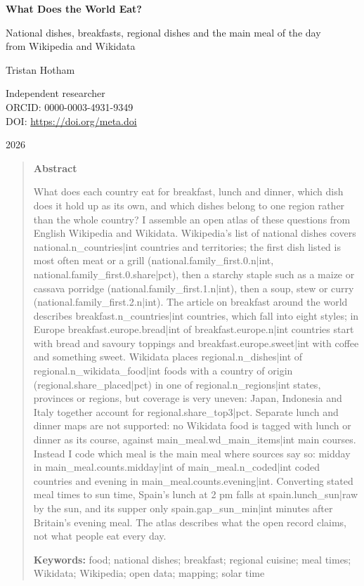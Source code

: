 \documentclass[11pt,a4paper]{article}
\begin{document}
\begin{center}
{\Large\bfseries What Does the World Eat?\par}
\vspace{0.4em}
{\large National dishes, breakfasts, regional dishes and the main meal of the day\\from Wikipedia and Wikidata\par}
\vspace{1.2em}
{\large Tristan Hotham\par}
\vspace{0.3em}
{\small Independent researcher\\
ORCID: 0000-0003-4931-9349\\
DOI: \href{https://doi.org/{{meta.doi}}}{https://doi.org/{{meta.doi}}}\par}
\vspace{0.8em}
2026
\end{center}

\begin{quote}
\small
\begin{center}\textbf{Abstract}\end{center}
What does each country eat for breakfast, lunch and dinner, which dish does it hold up as its own, and which dishes belong to one region rather than the whole country? I assemble an open atlas of these questions from English Wikipedia and Wikidata. Wikipedia's list of national dishes covers {{national.n_countries|int}} countries and territories; the first dish listed is most often meat or a grill ({{national.family_first.0.n|int}}, {{national.family_first.0.share|pct}}), then a starchy staple such as a maize or cassava porridge ({{national.family_first.1.n|int}}), then a soup, stew or curry ({{national.family_first.2.n|int}}). The article on breakfast around the world describes {{breakfast.n_countries|int}} countries, which fall into eight styles; in Europe {{breakfast.europe.bread|int}} of {{breakfast.europe.n|int}} countries start with bread and savoury toppings and {{breakfast.europe.sweet|int}} with coffee and something sweet. Wikidata places {{regional.n_dishes|int}} of {{regional.n_wikidata_food|int}} foods with a country of origin ({{regional.share_placed|pct}}) in one of {{regional.n_regions|int}} states, provinces or regions, but coverage is very uneven: Japan, Indonesia and Italy together account for {{regional.share_top3|pct}}. Separate lunch and dinner maps are not supported: no Wikidata food is tagged with lunch or dinner as its course, against {{main_meal.wd_main_items|int}} main courses. Instead I code which meal is the main meal where sources say so: midday in {{main_meal.counts.midday|int}} of {{main_meal.n_coded|int}} coded countries and evening in {{main_meal.counts.evening|int}}. Converting stated meal times to sun time, Spain's lunch at 2 pm falls at {{spain.lunch_sun|raw}} by the sun, and its supper only {{spain.gap_sun_min|int}} minutes after Britain's evening meal. The atlas describes what the open record claims, not what people eat every day.

\textbf{Keywords:} food; national dishes; breakfast; regional cuisine; meal times; Wikidata; Wikipedia; open data; mapping; solar time
\end{quote}
\end{document}
